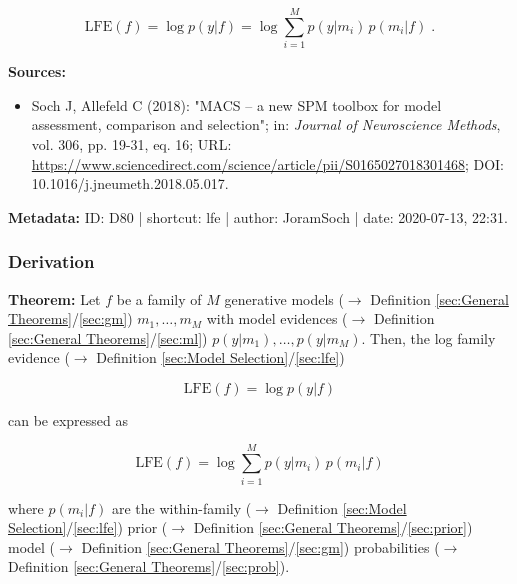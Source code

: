 \documentclass[a4paper,12pt,twoside]{book}
\begin{document}
\begin{equation} \label{eq:lfe-lfe}
\mathrm{LFE}(f) = \log p(y|f) = \log \sum_{i=1}^M p(y|m_i) \, p(m_i|f) \; .
\end{equation}


\vspace{1em}
\textbf{Sources:}
\begin{itemize}
\item Soch J, Allefeld C (2018): "MACS – a new SPM toolbox for model assessment, comparison and selection"; in: \textit{Journal of Neuroscience Methods}, vol. 306, pp. 19-31, eq. 16; URL: \url{https://www.sciencedirect.com/science/article/pii/S0165027018301468}; DOI: 10.1016/j.jneumeth.2018.05.017.
\end{itemize}


\vspace{1em}
\textbf{Metadata:} ID: D80 | shortcut: lfe | author: JoramSoch | date: 2020-07-13, 22:31.
\vspace{1em}



\subsubsection[\textbf{Derivation}]{Derivation} \label{sec:lfe-der}
\setcounter{equation}{0}

\textbf{Theorem:} Let $f$ be a family of $M$ generative models ($\rightarrow$ Definition \ref{sec:General Theorems}/\ref{sec:gm}) $m_1, \ldots, m_M$ with model evidences ($\rightarrow$ Definition \ref{sec:General Theorems}/\ref{sec:ml}) $p(y \vert m_1), \ldots, p(y \vert m_M)$. Then, the log family evidence ($\rightarrow$ Definition \ref{sec:Model Selection}/\ref{sec:lfe})

\begin{equation} \label{eq:lfe-der-LFE-term}
\mathrm{LFE}(f) = \log p(y|f)
\end{equation}

can be expressed as

\begin{equation} \label{eq:lfe-der-LFE-marg}
\mathrm{LFE}(f) = \log \sum_{i=1}^M p(y|m_i) \, p(m_i|f)
\end{equation}

where $p(m_i \vert f)$ are the within-family ($\rightarrow$ Definition \ref{sec:Model Selection}/\ref{sec:lfe}) prior ($\rightarrow$ Definition \ref{sec:General Theorems}/\ref{sec:prior}) model ($\rightarrow$ Definition \ref{sec:General Theorems}/\ref{sec:gm}) probabilities ($\rightarrow$ Definition \ref{sec:General Theorems}/\ref{sec:prob}).
\end{document}
